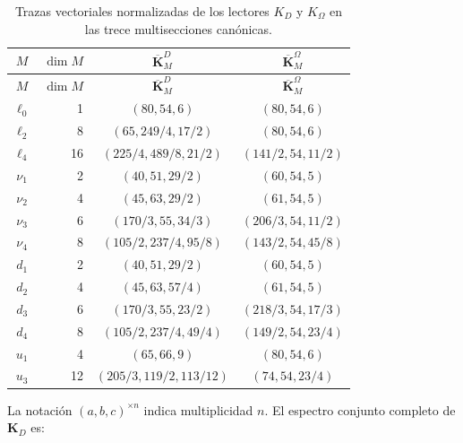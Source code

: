 \begin{longtable}{@{}c r c c@{}}
\caption{Trazas vectoriales normalizadas de los lectores \(K_D\) y
\(K_\Omega\) en las trece multisecciones canónicas.}
\label{tab:trazas-multisecciones-two-way-rev11}\\
\toprule
\(M\)&\(\dim M\)&\(\overline{\mathbf K}_M^D\)&\(\overline{\mathbf K}_M^\Omega\)\\
\midrule
\endfirsthead
\toprule
\(M\)&\(\dim M\)&\(\overline{\mathbf K}_M^D\)&\(\overline{\mathbf K}_M^\Omega\)\\
\midrule
\endhead
\(\ell_0\)&1&\((80,54,6)\)&\((80,54,6)\)\\
\(\ell_2\)&8&\((65,249/4,17/2)\)&\((80,54,6)\)\\
\(\ell_4\)&16&\((225/4,489/8,21/2)\)&\((141/2,54,11/2)\)\\
\(\nu_1\)&2&\((40,51,29/2)\)&\((60,54,5)\)\\
\(\nu_2\)&4&\((45,63,29/2)\)&\((61,54,5)\)\\
\(\nu_3\)&6&\((170/3,55,34/3)\)&\((206/3,54,11/2)\)\\
\(\nu_4\)&8&\((105/2,237/4,95/8)\)&\((143/2,54,45/8)\)\\
\(d_1\)&2&\((40,51,29/2)\)&\((60,54,5)\)\\
\(d_2\)&4&\((45,63,57/4)\)&\((61,54,5)\)\\
\(d_3\)&6&\((170/3,55,23/2)\)&\((218/3,54,17/3)\)\\
\(d_4\)&8&\((105/2,237/4,49/4)\)&\((149/2,54,23/4)\)\\
\(u_1\)&4&\((65,66,9)\)&\((80,54,6)\)\\
\(u_3\)&12&\((205/3,119/2,113/12)\)&\((74,54,23/4)\)\\
\bottomrule
\end{longtable}

La notación \((a,b,c)^{\times n}\) indica multiplicidad \(n\). El espectro
conjunto completo de \(\mathbf K_D\) es:

